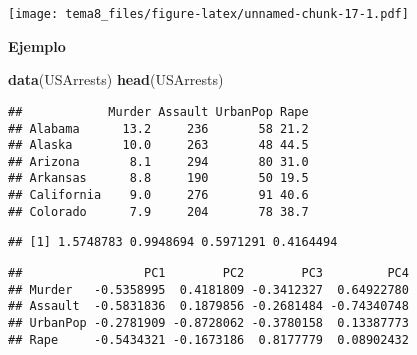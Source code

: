\documentclass[]{article}
\newenvironment{Shaded}{\begin{snugshade}}{\end{snugshade}}
\newcommand{\KeywordTok}[1]{\textcolor[rgb]{0.13,0.29,0.53}{\textbf{{#1}}}}
\newcommand{\DataTypeTok}[1]{\textcolor[rgb]{0.13,0.29,0.53}{{#1}}}
\newcommand{\StringTok}[1]{\textcolor[rgb]{0.31,0.60,0.02}{{#1}}}
\newcommand{\CommentTok}[1]{\textcolor[rgb]{0.56,0.35,0.01}{\textit{{#1}}}}
\newcommand{\OtherTok}[1]{\textcolor[rgb]{0.56,0.35,0.01}{{#1}}}
\newcommand{\NormalTok}[1]{{#1}}
\numberwithin{equation}{section}
\begin{document}
\texttt{[image: tema8\_files/figure-latex/unnamed-chunk-17-1.pdf]}

\textbf{Ejemplo}

\begin{Shaded}
\begin{Highlighting}[]
\KeywordTok{data}\NormalTok{(USArrests)}
\KeywordTok{head}\NormalTok{(USArrests)}
\end{Highlighting}
\end{Shaded}

\begin{verbatim}
##            Murder Assault UrbanPop Rape
## Alabama      13.2     236       58 21.2
## Alaska       10.0     263       48 44.5
## Arizona       8.1     294       80 31.0
## Arkansas      8.8     190       50 19.5
## California    9.0     276       91 40.6
## Colorado      7.9     204       78 38.7
\end{verbatim}

\begin{Shaded}
\end{Shaded}

\begin{verbatim}
## [1] 1.5748783 0.9948694 0.5971291 0.4164494
\end{verbatim}

\begin{Shaded}
\end{Shaded}

\begin{verbatim}
##                 PC1        PC2        PC3         PC4
## Murder   -0.5358995  0.4181809 -0.3412327  0.64922780
## Assault  -0.5831836  0.1879856 -0.2681484 -0.74340748
## UrbanPop -0.2781909 -0.8728062 -0.3780158  0.13387773
## Rape     -0.5434321 -0.1673186  0.8177779  0.08902432
\end{verbatim}

\begin{Shaded}
\end{Shaded}
\end{document}
